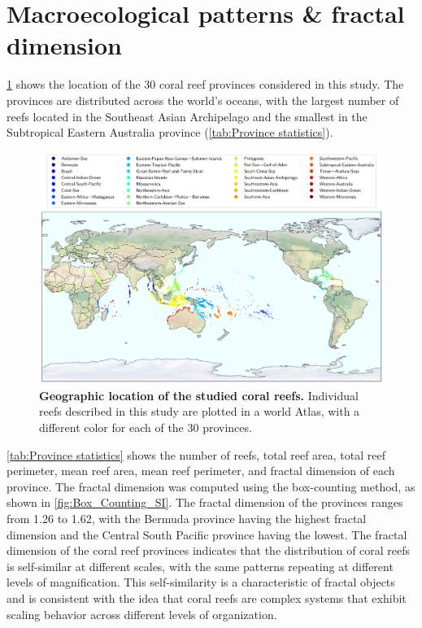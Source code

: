 \section{Macroecological patterns \& fractal dimension}

\cref{fig:reef-map} shows the location of the 30 coral reef provinces
considered in this study. The provinces are distributed across the world's
oceans, with the largest number of reefs located in the Southeast Asian
Archipelago and the smallest in the Subtropical Eastern Australia province
(\cref{tab:Province statistics}).

\begin{figure}[H]
    \centering
    \includegraphics[width=\textwidth]{Figures/Coral_reef_centroids.pdf}
    \caption[Geographic location of the studied coral reefs]{\textbf{Geographic
            location of the studied coral reefs.} Individual reefs described in
        this study
        are plotted in a world
        Atlas, with a different color for each of the 30 provinces.}
    \label{fig:reef-map}
\end{figure}

\cref{tab:Province statistics} shows the number of reefs, total reef area,
total reef perimeter, mean reef area, mean reef perimeter, and fractal
dimension of each province. The fractal dimension was computed using the
box-counting method, as shown in \cref{fig:Box_Counting_SI}. The fractal
dimension of the provinces ranges from 1.26 to 1.62, with the Bermuda province
having the highest fractal dimension and the Central South Pacific province
having the lowest. The fractal dimension of the coral reef
provinces indicates that the distribution of coral reefs is self-similar at
different scales, with the same patterns repeating at different levels of
magnification. This self-similarity is a characteristic of fractal objects and
is consistent with the idea that coral reefs are complex systems that exhibit
scaling behavior across different levels of organization.

